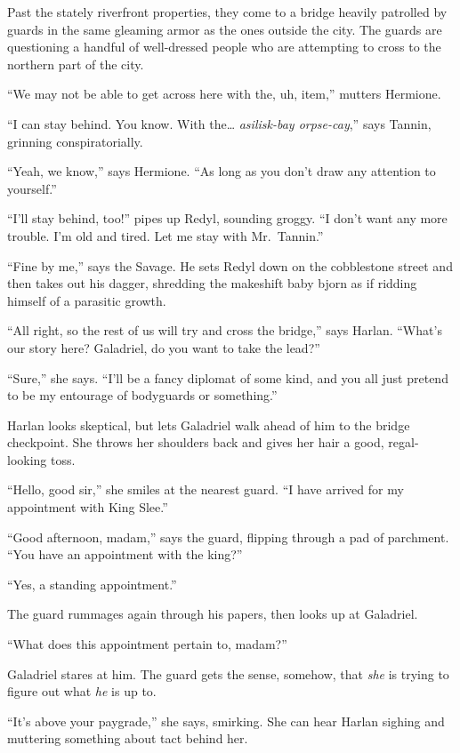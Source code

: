 \documentclass[smalldemyvopaper,11pt,twoside,onecolumn,openright,extrafontsizes]{memoir}
\begin{document}
Past the stately riverfront properties, they come to a bridge heavily
patrolled by guards in the same gleaming armor as the ones outside the
city. The guards are questioning a handful of well-dressed people who
are attempting to cross to the northern part of the city.

``We may not be able to get across here with the, uh, item,'' mutters
Hermione.

``I can stay behind. You know. With the\ldots{} \emph{asilisk-bay
orpse-cay},'' says Tannin, grinning conspiratorially.

``Yeah, we know,'' says Hermione. ``As long as you don't draw any
attention to yourself.''

``I'll stay behind, too!'' pipes up Redyl, sounding groggy. ``I don't
want any more trouble. I'm old and tired. Let me stay with Mr.~Tannin.''

``Fine by me,'' says the Savage. He sets Redyl down on the cobblestone
street and then takes out his dagger, shredding the makeshift baby bjorn
as if ridding himself of a parasitic growth.

``All right, so the rest of us will try and cross the bridge,'' says
Harlan. ``What's our story here? Galadriel, do you want to take the
lead?''

``Sure,'' she says. ``I'll be a fancy diplomat of some kind, and you all
just pretend to be my entourage of bodyguards or something.''

Harlan looks skeptical, but lets Galadriel walk ahead of him to the
bridge checkpoint. She throws her shoulders back and gives her hair a
good, regal-looking toss.

``Hello, good sir,'' she smiles at the nearest guard. ``I have arrived
for my appointment with King Slee.''

``Good afternoon, madam,'' says the guard, flipping through a pad of
parchment. ``You have an appointment with the king?''

``Yes, a standing appointment.''

The guard rummages again through his papers, then looks up at Galadriel.

``What does this appointment pertain to, madam?''

Galadriel stares at him. The guard gets the sense, somehow, that
\emph{she} is trying to figure out what \emph{he} is up to.

``It's above your paygrade,'' she says, smirking. She can hear Harlan
sighing and muttering something about tact behind her.
\end{document}
